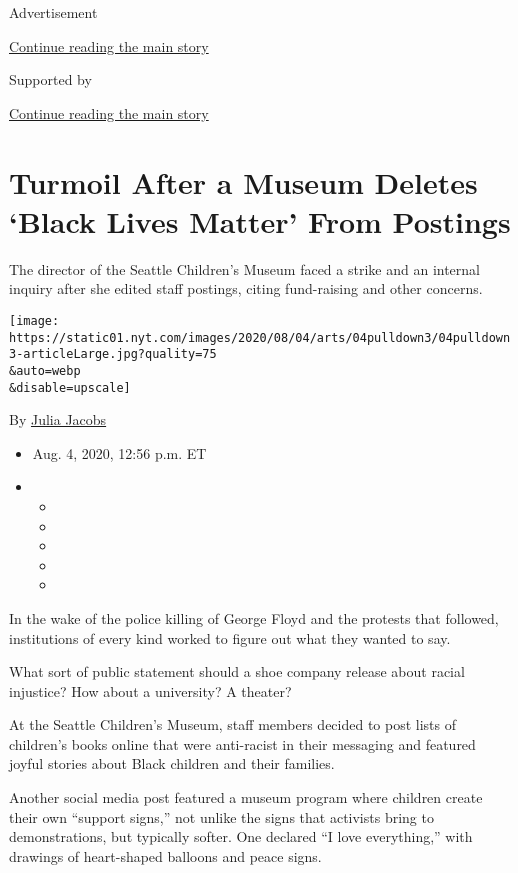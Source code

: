 Advertisement

\protect\hyperlink{after-top}{Continue reading the main story}

Supported by

\protect\hyperlink{after-sponsor}{Continue reading the main story}

\hypertarget{turmoil-after-a-museum-deletes-black-lives-matter-from-postings}{%
\section{Turmoil After a Museum Deletes `Black Lives Matter' From
Postings}\label{turmoil-after-a-museum-deletes-black-lives-matter-from-postings}}

The director of the Seattle Children's Museum faced a strike and an
internal inquiry after she edited staff postings, citing fund-raising
and other concerns.

\texttt{[image: https://static01.nyt.com/images/2020/08/04/arts/04pulldown3/04pulldown3-articleLarge.jpg?quality=75\\\&auto=webp\\\&disable=upscale]}

By \href{https://www.nytimes.com/by/julia-jacobs}{Julia Jacobs}

\begin{itemize}
\item
  Aug. 4, 2020, 12:56 p.m. ET
\item
  \begin{itemize}
  \item
  \item
  \item
  \item
  \item
  \end{itemize}
\end{itemize}

In the wake of the police killing of George Floyd and the protests that
followed, institutions of every kind worked to figure out what they
wanted to say.

What sort of public statement should a shoe company release about racial
injustice? How about a university? A theater?

At the Seattle Children's Museum, staff members decided to post lists of
children's books online that were anti-racist in their messaging and
featured joyful stories about Black children and their families.

Another social media post featured a museum program where children
create their own ``support signs,'' not unlike the signs that activists
bring to demonstrations, but typically softer. One declared ``I love
everything,'' with drawings of heart-shaped balloons and peace signs.

